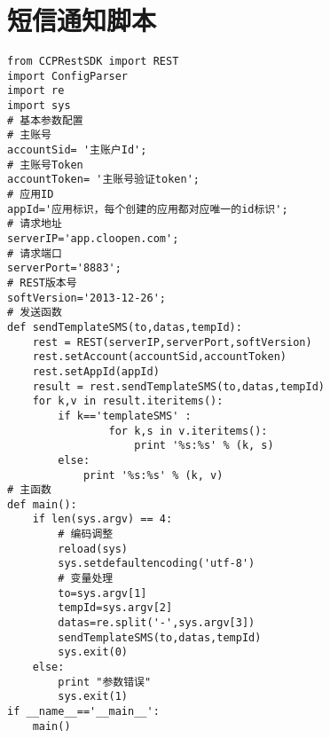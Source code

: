 \chapter{短信通知脚本}
\label{cha:sms}
\begin{lstlisting}[numbers=none]
from CCPRestSDK import REST
import ConfigParser
import re
import sys
# 基本参数配置
# 主账号
accountSid= '主账户Id';
# 主账号Token
accountToken= '主账号验证token';
# 应用ID
appId='应用标识，每个创建的应用都对应唯一的id标识';
# 请求地址
serverIP='app.cloopen.com';
# 请求端口
serverPort='8883';
# REST版本号
softVersion='2013-12-26';
# 发送函数
def sendTemplateSMS(to,datas,tempId):
    rest = REST(serverIP,serverPort,softVersion)
    rest.setAccount(accountSid,accountToken)
    rest.setAppId(appId)
    result = rest.sendTemplateSMS(to,datas,tempId)
    for k,v in result.iteritems():
        if k=='templateSMS' :
                for k,s in v.iteritems():
                    print '%s:%s' % (k, s)
        else:
            print '%s:%s' % (k, v)
# 主函数
def main():
    if len(sys.argv) == 4:
        # 编码调整
        reload(sys)
        sys.setdefaultencoding('utf-8')
        # 变量处理
        to=sys.argv[1]
        tempId=sys.argv[2]
        datas=re.split('-',sys.argv[3])
        sendTemplateSMS(to,datas,tempId)
        sys.exit(0)
    else:
        print "参数错误"
        sys.exit(1)
if __name__=='__main__':
    main()
\end{lstlisting}
